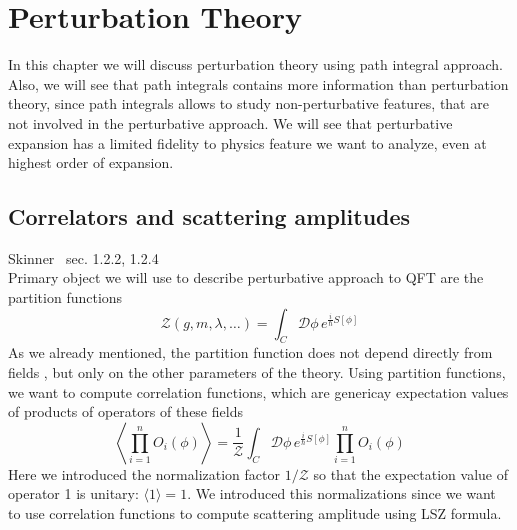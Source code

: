 \documentclass[../main/main.tex]{subfiles}
\begin{document}
\chapter{Perturbation Theory}

In this chapter we will discuss perturbation theory using path integral approach. Also, we will see that path integrals contains more information than perturbation theory, since path integrals allows to study non-perturbative features, that are not involved in the  perturbative approach. We will see that perturbative expansion has a limited fidelity to physics feature we want to analyze, even at highest order of expansion. 

\section{Correlators and scattering amplitudes}

\textsf{Skinner~\cite{Skinner:2018aa} sec. 1.2.2, 1.2.4}\\

Primary object we will use to describe perturbative approach to QFT are the partition functions
\[\mathcal Z(g,m,\lambda,\dots)=\int_C\mathcal D\phi \,e^{\frac i\hbar S[\phi]}\]
As we already mentioned, the partition function does not depend directly from fields , but only on the other parameters of the theory. Using partition functions, we want to compute correlation functions, which are genericay expectation values of products of operators of these fields
\begin{equation}\label{eqn:exp-value-prod-corr}\boxed{
\left\langle\prod_{i=1}^nO_i(\phi)\right\rangle=\frac1{\mathcal Z}\int_C\mathcal D\phi \,e^{\frac i\hbar S[\phi]}\prod_{i=1}^nO_i(\phi)
}\end{equation}
Here we introduced the normalization factor $1/\mathcal Z$ so that the expectation value of operator 1 is unitary: $\langle1\rangle=1$. We introduced this normalizations since we want to use correlation functions to compute scattering amplitude using LSZ formula. 
\end{document}
